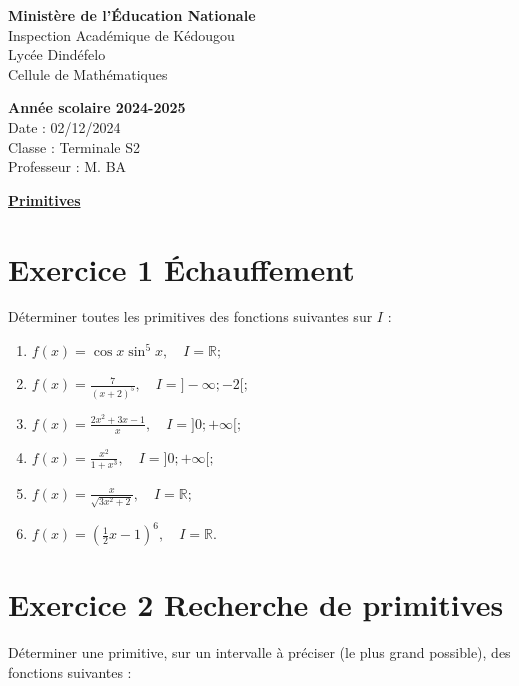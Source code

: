 \documentclass[12pt]{article}
\begin{document}
\noindent
\begin{minipage}[t]{0.48\textwidth}
\raggedright
\textbf{Ministère de l'Éducation Nationale}\\
Inspection Académique de Kédougou\\
Lycée Dindéfelo\\
Cellule de Mathématiques
\end{minipage}
\hfill
\begin{minipage}[t]{0.48\textwidth}
\raggedleft
\textbf{Année scolaire 2024-2025}\\
Date : 02/12/2024\\
Classe : Terminale S2\\
Professeur : M. BA
\end{minipage}
\begin{center}
\underline{\textbf{Primitives}}
\end{center}
\section*{Exercice 1 \quad Échauffement}

Déterminer toutes les primitives des fonctions suivantes sur \( I \) :

\begin{enumerate}
    \item[\textbf{a)}] \( f(x) = \cos x \sin^5 x, \quad I = \mathbb{R}; \)
    \item[\textbf{b)}] \( f(x) = \frac{7}{(x+2)^{5}}, \quad I = ]-\infty; -2[; \)
    \item[\textbf{c)}] \( f(x) = \frac{2x^{2}+3x-1}{x}, \quad I = ]0; +\infty[; \)
    \item[\textbf{d)}] \( f(x) = \frac{x^{2}}{1+x^{3}}, \quad I = ]0; +\infty[; \)
    \item[\textbf{e)}] \( f(x) = \frac{x}{\sqrt{3x^2 + 2}}, \quad I = \mathbb{R}; \)
    \item[\textbf{f)}] \( f(x) = \left( \frac{1}{2}x-1 \right)^6, \quad I = \mathbb{R}. \)
\end{enumerate}
\section*{Exercice 2 \quad Recherche de primitives}

Déterminer une primitive, sur un intervalle à préciser (le plus grand possible), des fonctions suivantes :
\end{document}

